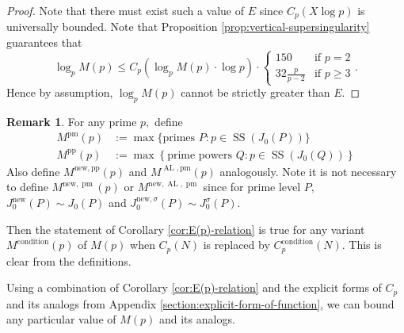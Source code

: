 \documentclass[11pt,letterpaper,reqno]{amsart}
\theoremstyle{definition}
\newtheorem{remark}[theorem]{Remark}
\numberwithin{equation}{section}
\numberwithin{figure}{section}
\numberwithin{table}{section}
\newcommand{\nw}{\mathrm{new}}
\begin{document}
\begin{proof}
    Note that there must exist such a value of $E$ since $C_p(X \log p)$ is universally bounded. Note that Proposition \ref{prop:vertical-supersingularity} guarantees that
    $$\log_p M(p) \leq C_p \left( \log_p M(p) \cdot \log p \right) \cdot \begin{cases}
            150 & \text{if } p = 2\\
            32 \frac{p}{p - 2} 
            & \text{if }
            p \ge 3
        \end{cases}.$$
    Hence by assumption, $\log_p M(p)$ cannot be strictly greater than $E.$
\end{proof}



\begin{remark}\label{rmk:extension-of-corollary-formula-for-M}
For any prime $p,$ define
\begin{align}
    M^{\text{pm}}(p) &:= \max \{ \text{primes $P$} : p \in \operatorname{SS}\!\left( J_0(P) \right) \}  \\
    M^{\text{pp}}(p) &:=  \max \left\{ \text{prime powers $Q$}  : \text{$p \in \operatorname{SS}\!\left(J_0(Q) \right)$}  \right\}
\end{align}
Also define $M^{\nw, \text{pp}}(p)$ and $M^{\operatorname{AL}, \text{pm}}(p)$ analogously. Note it is not necessary to define $M^{\nw, \operatorname{pm}}(p)$ or $M^{\nw, \operatorname{AL}, \operatorname{pm}}$ since for prime level $P,$ $J_0^\nw(P) \sim J_0(P)$ and $J_0^{\nw, \sigma}(P) \sim J_0^\sigma(P)$.

    Then the statement of Corollary \ref{cor:E(p)-relation} is true for any variant $M^{\text{condition}}(p)$ of $M(p)$ when $C_p(N)$ is replaced by $C_p^{\text{condition}}(N).$ This is clear from the definitions.
\end{remark}

Using a combination of Corollary \ref{cor:E(p)-relation} and the explicit forms of $C_p$ and its analogs from Appendix \ref{section:explicit-form-of-function}, we can bound any particular value of $M(p)$ and its analogs.
\end{document}

